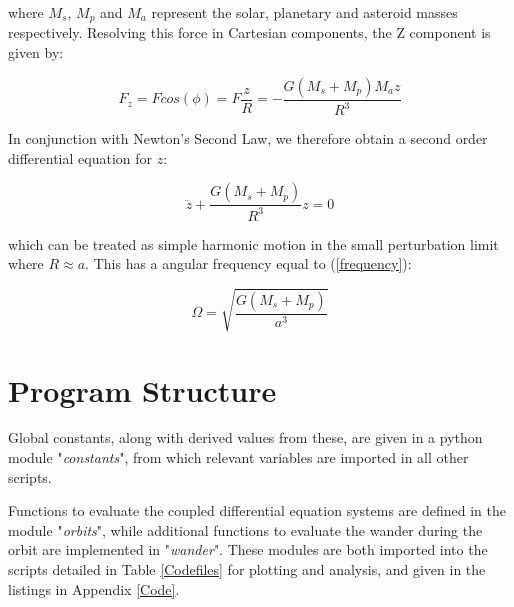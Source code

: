 \documentclass[11pt, a4paper,twocolumn]{article} %
\begin{document}
\begin{appendices}
where $M_{s}$, $M_{p}$ and $M_{a}$ represent the solar, planetary and asteroid masses respectively. Resolving this force in Cartesian components, the Z component is given by:

\begin{equation}
F_{z} = F cos(\phi) = F \frac{z}{R} = - \frac{G (M_{s} + M_{p}) M_{a} z}{R^{3}}
\end{equation}

In conjunction with Newton's Second Law, we therefore obtain a second order differential equation for $z$:

\begin{equation}
\ddot{z} + \frac{G (M_{s} + M_{p})}{R^{3}} z = 0
\end{equation}
	 
which can be treated as simple harmonic motion in the small perturbation limit where $R \approx a$. This has a angular frequency equal to (\ref{frequency}):

\begin{equation}
\Omega = \sqrt{\frac{G (M_{s} + M_{p})}{a^{3}}}
\end{equation}

\section{Program Structure} \label{structure}
Global constants, along with derived values from these, are given in a python module "\textit{constants}", from which relevant variables are imported in all other scripts.

Functions to evaluate the coupled differential equation systems are defined in the module "\textit{orbits}", while additional functions to evaluate the wander during the orbit are implemented in "\textit{wander}". These modules are both imported into the scripts detailed in Table \ref{Codefiles} for plotting and analysis, and given in the listings in Appendix \ref{Code}.




\end{appendices}
\end{document}
